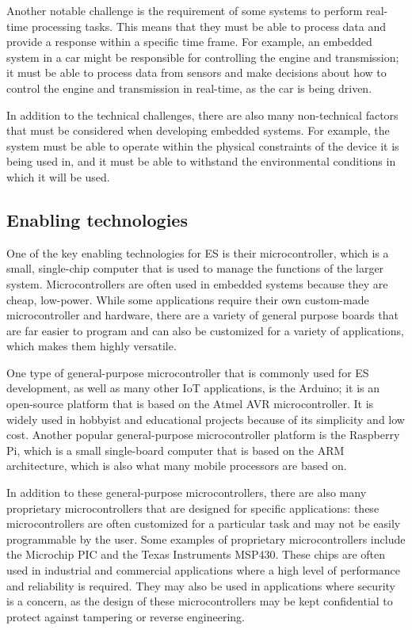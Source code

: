Another notable challenge is the requirement of some systems to perform real-time processing tasks. This means that they must be able to process data and provide a response within a specific time frame. For example, an embedded system in a car might be responsible for controlling the engine and transmission; it must be able to process data from sensors and make decisions about how to control the engine and transmission in real-time, as the car is being driven.

In addition to the technical challenges, there are also many non-technical factors that must be considered when developing embedded systems. For example, the system must be able to operate within the physical constraints of the device it is being used in, and it must be able to withstand the environmental conditions in which it will be used.


\subsection{Enabling technologies}
One of the key enabling technologies for ES is their microcontroller, which is a small, single-chip computer that is used to manage the functions of the larger system. Microcontrollers are often used in embedded systems because they are cheap, low-power. While some applications require their own custom-made microcontroller and hardware, there are a variety of  general purpose boards that are far easier to program and can also be customized for a variety of applications, which makes them highly versatile.

One type of general-purpose microcontroller that is commonly used for ES development, as well as many other IoT applications, is the Arduino; it is an open-source platform that is based on the Atmel AVR microcontroller. It is widely used in hobbyist and educational projects because of its simplicity and low cost. Another popular general-purpose microcontroller platform is the Raspberry Pi, which is a small single-board computer that is based on the ARM architecture, which is also what many mobile processors are based on.

In addition to these general-purpose microcontrollers, there are also many proprietary microcontrollers that are designed for specific applications: these microcontrollers are often customized for a particular task and may not be easily programmable by the user. Some examples of proprietary microcontrollers include the Microchip PIC and the Texas Instruments MSP430. These chips are often used in industrial and commercial applications where a high level of performance and reliability is required. They may also be used in applications where security is a concern, as the design of these microcontrollers may be kept confidential to protect against tampering or reverse engineering.


